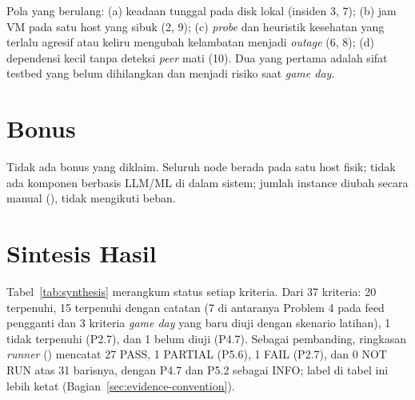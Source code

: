 \documentclass{fairmeta}
\newcommand{\code}[1]{\texttt{\detokenize{#1}}}
\newcommand{\en}[1]{\textit{#1}}
\begin{document}
Pola yang berulang: (a) keadaan tunggal pada disk lokal (insiden 3, 7); (b) jam VM pada satu host yang sibuk (2, 9); (c) \en{probe} dan heuristik kesehatan yang terlalu agresif atau keliru mengubah kelambatan menjadi \en{outage} (6, 8); (d) dependensi kecil tanpa deteksi \en{peer} mati (10). Dua yang pertama adalah sifat testbed yang belum dihilangkan dan menjadi risiko saat \en{game day}.

\section{Bonus}
\label{sec:bonus}

Tidak ada bonus yang diklaim. Seluruh node berada pada satu host fisik; tidak ada komponen berbasis LLM/ML di dalam sistem; jumlah instance diubah secara manual (\code{kubectl scale}), tidak mengikuti beban.

\clearpage
\section{Sintesis Hasil}

Tabel~\ref{tab:synthesis} merangkum status setiap kriteria. Dari 37 kriteria: 20 terpenuhi, 15 terpenuhi dengan catatan (7 di antaranya Problem 4 pada feed pengganti dan 3 kriteria \en{game day} yang baru diuji dengan skenario latihan), 1 tidak terpenuhi (P2.7), dan 1 belum diuji (P4.7). Sebagai pembanding, ringkasan \en{runner} () mencatat 27 PASS, 1 PARTIAL (P5.6), 1 FAIL (P2.7), dan 0 NOT RUN atas 31 barisnya, dengan P4.7 dan P5.2 sebagai INFO; label di tabel ini lebih ketat (Bagian~\ref{sec:evidence-convention}).
\end{document}
